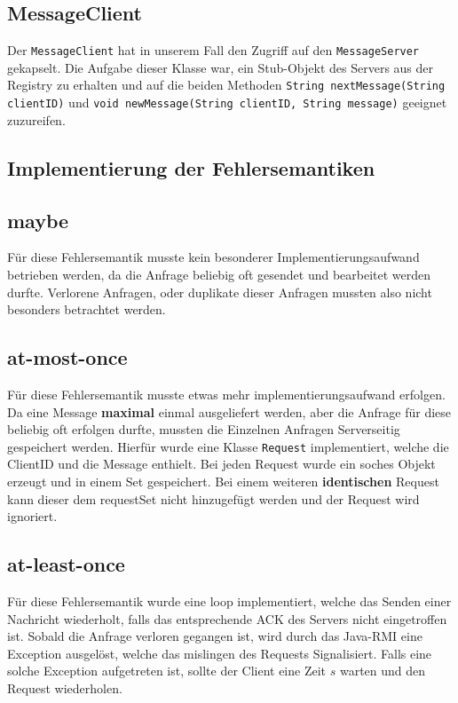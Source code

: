 \documentclass[a4paper, 12pt]{scrartcl}
\begin{document}
\subsection{MessageClient}
Der \lstinline|MessageClient| hat in unserem Fall den Zugriff auf den \lstinline|MessageServer| gekapselt. Die Aufgabe dieser Klasse war, ein Stub-Objekt des Servers aus der Registry zu erhalten und auf die beiden Methoden \lstinline|String nextMessage(String clientID)| und \lstinline|void newMessage(String clientID, String message)| geeignet zuzureifen.

\subsection{Implementierung der Fehlersemantiken}
\subsection{maybe}
Für diese Fehlersemantik musste kein besonderer Implementierungsaufwand betrieben werden, da die Anfrage beliebig oft gesendet und bearbeitet werden durfte. Verlorene Anfragen, oder duplikate dieser Anfragen mussten also nicht besonders betrachtet werden.

\subsection{at-most-once}
Für diese Fehlersemantik musste etwas mehr implementierungsaufwand erfolgen. Da eine Message \textbf{maximal} einmal ausgeliefert werden, aber die Anfrage für diese beliebig oft erfolgen durfte, mussten die Einzelnen Anfragen Serverseitig gespeichert werden. Hierfür wurde eine Klasse \lstinline|Request| implementiert, welche die ClientID und die Message enthielt. Bei jeden Request wurde ein soches Objekt erzeugt und in einem Set gespeichert. Bei einem weiteren \textbf{identischen} Request kann dieser dem \glqq{}requestSet\grqq{} nicht hinzugefügt werden und der Request wird ignoriert.

\subsection{at-least-once}
Für diese Fehlersemantik wurde eine loop implementiert, welche das Senden einer Nachricht wiederholt, falls das entsprechende ACK des Servers nicht eingetroffen ist. 
Sobald die Anfrage verloren gegangen ist, wird durch das Java-RMI eine Exception ausgelöst, welche das mislingen des Requests Signalisiert. Falls eine solche Exception aufgetreten ist, sollte der Client eine Zeit $s$ warten und den Request wiederholen.
\end{document}
